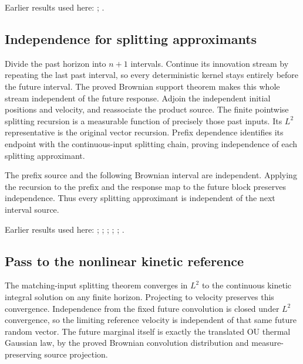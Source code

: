\documentclass[11pt,a4paper]{report}
\begin{document}
Earlier results used here: \cite[Section~3.17.1]{LangevinLean2026ULASC}; \cite[Section~3.8.17]{LangevinLean2026ULASC}.
\subsection{\texorpdfstring{Independence for splitting approximants}{Independence for splitting approximants}}
\label{report-step-KineticLangevin-CanonicalPastFuture-lean-3}


Divide the past horizon into \(n+1\) intervals. Continue its innovation stream by repeating the last past interval, so every deterministic kernel stays entirely before the future interval. The proved Brownian support theorem makes this whole stream independent of the future response. Adjoin the independent initial positions and velocity, and reassociate the product source. The finite pointwise splitting recursion is a measurable function of precisely those past inputs. Its \(L^{2}\) representative is the original vector recursion. Prefix dependence identifies its endpoint with the continuous-input splitting chain, proving independence of each splitting approximant.



The prefix source and the following Brownian interval are independent. Applying the recursion to the prefix and the response map to the future block preserves independence. Thus every splitting approximant is independent of the next interval source.



Earlier results used here: \cite[Section~3.13.2]{LangevinLean2026ULASC}; \cite[Section~3.17.1]{LangevinLean2026ULASC}; \cite[Section~3.20.1]{LangevinLean2026ULASC}; \cite[Section~3.20.4]{LangevinLean2026ULASC}; \cite[Section~3.8.16]{LangevinLean2026ULASC}; \cite[Section~3.8.17]{LangevinLean2026ULASC}.
\subsection{\texorpdfstring{Pass to the nonlinear kinetic reference}{Pass to the nonlinear kinetic reference}}
\label{report-step-KineticLangevin-CanonicalPastFuture-lean-4}


The matching-input splitting theorem converges in \(L^{2}\) to the continuous kinetic integral solution on any finite horizon. Projecting to velocity preserves this convergence. Independence from the fixed future convolution is closed under \(L^{2}\) convergence, so the limiting reference velocity is independent of that same future random vector. The future marginal itself is exactly the translated OU thermal Gaussian law, by the proved Brownian convolution distribution and measure-preserving source projection.
\end{document}
